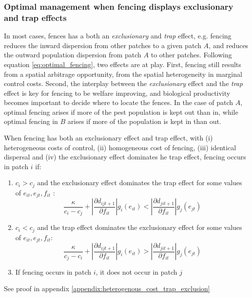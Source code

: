 

\subsubsection{Optimal management when fencing displays exclusionary and trap effects}

In most cases, fences has a both an \textit{exclusionary} and \textit{trap} effect, e.g. fencing reduces the inward dispersion from other patches to a given patch $A$, and reduces the outward population dispersion from patch $A$ to other patches. Following equation \ref{eq:optimal_fencing}, two effects are at play. First, fencing still results from a spatial arbitrage opportunity, from the spatial heterogeneity in marginal control costs. Second, the interplay between the \textit{exclusionary} effect and the \textit{trap} effect is key for fencing to be welfare improving, and biological productivity becomes important to decide where to locate the fences. In the case of patch $A$, optimal fencing arises if more of the pest population is kept out than in, while optimal fencing in $B$ arises if more of the population is kept in than out.

\begin{proposition}
\label{proposition:optimal_fencing_both_effects}
	When fencing has both an exclusionary effect and trap effect, with (i) heterogeneous costs of control, (ii) homogeneous cost of fencing, (iii) identical dispersal and (iv) the exclusionary effect dominates he trap effect, fencing occurs in patch $i$ if: 
	\begin{enumerate}
	\item $c_i>c_j$ and the exclusionary effect dominates the trap effect for some values of $e_{it}, e_{jt}, f_{it}$ : 
	\begin{equation}
	\frac{\kappa}{c_i - c_j} + \left|\frac{\partial d_{ijt+1}}{\partial f_{it}}\right|g_i(e_{it}) < \left|\frac{\partial d_{jit+1}}{\partial f_{it}}\right|g_j(e_{jt})
	\label{eq:optimal_fencing_both_effects_ci}
	\end{equation}
	\item $c_i<c_j$ and the trap effect dominates the exclusionary effect for some values of $e_{it}, e_{jt}, f_{it}$: 
		\begin{equation}
	\frac{\kappa}{c_j - c_i} + \left|\frac{\partial d_{ijt+1}}{\partial f_{it}}\right|g_i(e_{it}) > \left|\frac{\partial d_{jit+1}}{\partial f_{it}}\right|g_j(e_{jt})
	\end{equation}
	\item If fencing occurs in patch $i$, it does not occur in patch $j$
	\end{enumerate}
	
See proof in appendix \ref{appendix:heterogenous_cost_trap_exclusion}
\end{proposition}

